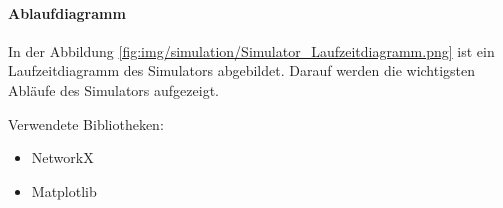 \documentclass[../main.tex]{subfiles}
\begin{document}
\paragraph{Ablaufdiagramm}
In der Abbildung \ref{fig:img/simulation/Simulator_Laufzeitdiagramm.png} ist ein Laufzeitdiagramm des Simulators abgebildet. Darauf werden die wichtigsten Abläufe des Simulators aufgezeigt. 



Verwendete Bibliotheken:

\begin{itemize}
    \item NetworkX
    \item Matplotlib
\end{itemize}
\end{document}
